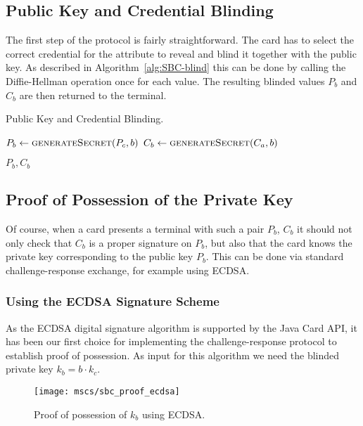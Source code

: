 \subsection{Public Key and Credential Blinding}

The first step of the protocol is fairly straightforward. The card has to
select the correct credential for the attribute to reveal and blind it together
with the public key. As described in Algorithm~\ref{alg:SBC-blind} this can be
done by calling the Diffie-Hellman operation once for each value. The resulting
blinded values $P_b$ and $C_b$ are then returned to the terminal.

\begin{algorithm}
  \caption{Public Key and Credential Blinding.}
  \label{alg:SBC-blind}
  \addtolength{\baselineskip}{1mm}
  \begin{algorithmic}[1]
      \State $P_b \gets \Call{generateSecret}{P_c, b}$
      \State $C_b \gets \Call{generateSecret}{C_a, b}$

      \Return $P_b, C_b$
    \EndFunction
  \end{algorithmic}
\end{algorithm}

\subsection{Proof of Possession of the Private Key}

Of course, when a card presents a terminal with such a pair $P_b$, $C_b$ it
should not only check that $C_b$ is a proper signature on $P_b$, but also that
the card knows the private key corresponding to the public key $P_b$. This can
be done via standard challenge-response exchange, for example using ECDSA.

\subsubsection{Using the ECDSA Signature Scheme}

As the ECDSA digital signature algorithm is supported by the Java Card API, it
has been our first choice for implementing the challenge-response protocol to
establish proof of possession. As input for this algorithm we need the blinded
private key $k_b = b \cdot k_c$.

\begin{figure}[ht]
  \centering
  \texttt{[image: mscs/sbc\_proof\_ecdsa]}
  \caption{Proof of possession of $k_b$ using ECDSA.}
  \label{fig:SBC-proof-ECDSA}
\end{figure}

